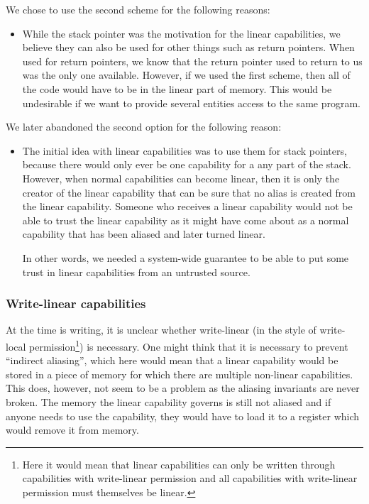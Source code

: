 \documentclass[a4paper]{article}
\begin{document}
We chose to use the second scheme for the following reasons:
\begin{itemize}
\item While the stack pointer was the motivation for the linear capabilities, we believe they can also be used for other things such as return pointers. When used for return pointers, we know that the return pointer used to return to us was the only one available. However, if we used the first scheme, then all of the code would have to be in the linear part of memory. This would be undesirable if we want to provide several entities access to the same program. 
\end{itemize}
We later abandoned the second option for the following reason:
\begin{itemize}
\item The initial idea with linear capabilities was to use them for stack pointers, because there would only ever be one capability for a any part of the stack. However, when normal capabilities can become linear, then it is only the creator of the linear capability that can be sure that no alias is created from the linear capability. Someone who receives a linear capability would not be able to trust the linear capability as it might have come about as a normal capability that has been aliased and later turned linear.

In other words, we needed a system-wide guarantee to be able to put some trust in linear capabilities from an untrusted source.
\end{itemize}

\subsubsection{Write-linear capabilities}

At the time is writing, it is unclear whether write-linear (in the style of write-local permission\footnote{Here it would mean that linear capabilities can only be written through capabilities with write-linear permission and all capabilities with write-linear permission must themselves be linear.}) is necessary. One might think that it is necessary to prevent ``indirect aliasing'', which here would mean that a linear capability would be stored in a piece of memory for which there are multiple non-linear capabilities. This does, however, not seem to be a problem as the aliasing invariants are never broken. The memory the linear capability governs is still not aliased and if anyone needs to use the capability, they would have to load it to a register which would remove it from memory.
\end{document}
